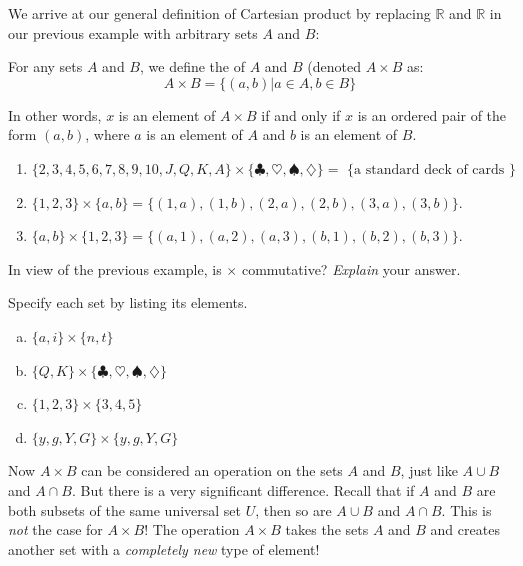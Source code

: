 We arrive at our general definition of Cartesian product by replacing ${\mathbb R}$ and ${\mathbb R}$ in our previous example with arbitrary sets $A$ and $B$:

\begin{defn}
For any sets $A$ and $B$, we define the  of $A$ and $B$ (denoted $A \times B$ as:
\[
A \times B = \{ (a, b) | a \in A, b \in B \}\]

\noindent
In other words, $x$ is an element of $A \times B$ if and only if $x$ is an ordered pair of the form $(a,b)$, where $a$ is an element of $A$ and $b$ is an element of $B$.

\end{defn} 

\begin{example}{}
\begin{enumerate} 
\item
$\{2, 3, 4, 5, 6, 7, 8, 9, 10, J, Q, K, A \} \times \{ \clubsuit, \heartsuit, \spadesuit, \diamondsuit \} =  \mbox{ \{a standard deck of cards \}}$
\item 
$\{1, 2, 3\} \times \{a, b\} = \{ (1, a), (1, b), (2, a), (2, b), (3, a), (3, b) \}$.
\item
$\{a, b\} \times \{1, 2, 3\} = \{ (a, 1), (a, 2), (a, 3), (b, 1), (b, 2), (b, 3) \}$. 
\end{enumerate}
\end{example}

\begin{exercise}{}
In view of the previous example, is $\times$ commutative?  \emph{Explain} your answer.
\end{exercise}
 
\begin{exercise}{}
Specify each set by listing its elements. 
\begin{multicols}{2}
\begin{enumerate}[(a)]
\item
$\{a, i\} \times \{n, t\}$
\item
$\{Q, K\} \times \{ \clubsuit, \heartsuit, \spadesuit, \diamondsuit \}$
\item
$\{1, 2, 3\} \times \{3, 4, 5\}$
\item
$\{y,g,Y,G\} \times \{y,g,Y,G\}$
\end{enumerate}
\end{multicols}
\end{exercise}

Now $A \times B$ can be considered an operation on the sets $A$ and $B$, just like $A \cup B$ and $A \cap B$. But there is a very significant difference. Recall that if $A$ and $B$ are both subsets of the same universal set $U$, then so are $A \cup B$ and $A \cap B$. This is \emph{not} the case for $A \times B$! The operation $A \times B$ takes the sets $A$ and $B$ and creates another set with a \emph{completely new} type of element!

